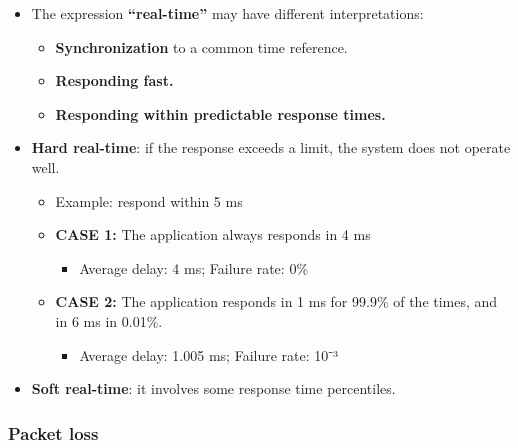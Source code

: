 \documentclass[
]{article}
\providecommand{\tightlist}{%
  \setlength{\itemsep}{0pt}\setlength{\parskip}{0pt}}
\begin{document}
\begin{itemize}
\tightlist
\item
  The expression \textbf{``real-time''} may have different
  interpretations:

  \begin{itemize}
  \tightlist
  \item
    \textbf{Synchronization} to a common time reference.
  \item
    \textbf{Responding fast.}
  \item
    \textbf{Responding within predictable response times.}\\
  \end{itemize}
\item
  \textbf{Hard real-time}: if the response exceeds a limit, the system
  does not operate well.

  \begin{itemize}
  \tightlist
  \item
    Example: respond within 5 ms
  \item
    \textbf{CASE 1:} The application always responds in 4 ms

    \begin{itemize}
    \tightlist
    \item
      Average delay: 4 ms; Failure rate: 0\%
    \end{itemize}
  \item
    \textbf{CASE 2:} The application responds in 1 ms for 99.9\% of the
    times, and in 6 ms in 0.01\%.

    \begin{itemize}
    \tightlist
    \item
      Average delay: 1.005 ms; Failure rate: 10⁻³
    \end{itemize}
  \end{itemize}
\item
  \textbf{Soft real-time}: it involves some response time percentiles.
\end{itemize}

\subsubsection{Packet loss}\label{packet-loss}
\end{document}
